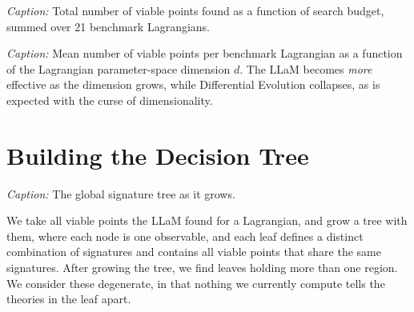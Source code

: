 \documentclass[11pt]{article}
\newcommand{\figplace}[3][]{%
  \begin{tcolorbox}[colback=blue!4,colframe=blue!40!black,
                    title={Figure: \texttt{#2}\ifx\relax#1\relax\else\ (#1)\fi}]
  \emph{Caption:} #3
  \end{tcolorbox}}
\newcommand{\videoplace}[2]{%
  \begin{tcolorbox}[colback=purple!4,colframe=purple!45!black,
                    title={Video: \texttt{#1} (wide)}]
  \emph{Caption:} #2
  \end{tcolorbox}}
\newenvironment{figrow}{}{}
\begin{document}
\begin{figrow}
\figplace{total-viable-count-vs-budget-summed-over-21-benchmark-lagrangians}{%
Total number of viable points found as a function of search budget, summed
over 21 benchmark Lagrangians.}

\figplace{mean-viable-per-lagrangian}{Mean number of viable points per
benchmark Lagrangian as a function of the Lagrangian parameter-space dimension
$d$. The LLaM becomes \textit{more} effective as the dimension grows, while
Differential Evolution collapses, as is expected with the curse of
dimensionality.}
\end{figrow}


\section{Building the Decision Tree}

\videoplace{search-and-tree}{The global signature tree as it grows.}

We take all viable points the LLaM found for a Lagrangian, and
grow a tree with them, where each node is one observable, and each leaf defines a distinct combination of signatures and contains all viable points that share the same signatures. After growing the tree, we find leaves holding more than one region. We consider these degenerate, in that nothing we currently compute tells the theories in the leaf apart. 
\end{document}
